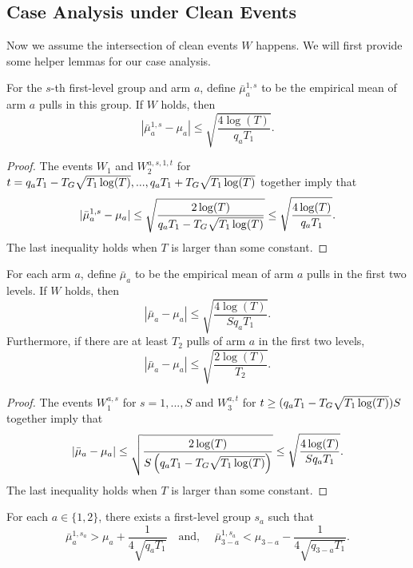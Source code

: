 \subsection{Case Analysis under Clean Events}
Now we assume the intersection of clean events $W$ happens. We will
first provide some helper lemmas for our case analysis.

\begin{lemma}
  For the $s$-th first-level group and arm $a$, define
  $\bar{\mu}_a^{1,s}$ to be the empirical mean of arm $a$ pulls in
  this group. If $W$ holds, then
  \[
    |\bar{\mu}_a^{1,s} - \mu_a| \leq \sqrt{\frac{4\log(T)}{q_a T_1}}.
  \]
\end{lemma}

\begin{proof}
  The events $W_1$ and $W_2^{a,s,1,t}$ for
  $t = q_a T_1- T_G \sqrt{T_1\log(T)},...,q_a T_1 + T_G
  \sqrt{T_1\log(T)}$ together imply that
\[
|\bar{\mu}_a^{1,s} - \mu_a| \leq \sqrt{\frac{2\log(T)}{q_a T_1- T_G \sqrt{T_1\log(T)}}} \leq \sqrt{\frac{4\log(T)}{q_a T_1}}.
\]
The last inequality holds when $T$ is larger than some constant.
\end{proof}


\begin{lemma}
  For each arm $a$, define $\bar{\mu}_a$ to be the empirical mean of
  arm $a$ pulls in the first two levels. If $W$ holds, then
  \[
    |\bar{\mu}_a - \mu_a| \leq \sqrt{\frac{4\log(T)}{S q_a T_1}} .
  \]
Furthermore, if there are at least $T_2$ pulls of arm $a$ in the first
two levels,
\[
|\bar{\mu}_a-\mu_a| \leq \sqrt{\frac{2\log(T)}{T_2}}. 
\]
\end{lemma}

\begin{proof}
The events $W_1^{a,s}$ for $s=1,...,S$ and $W_3^{a,t}$ for $t \geq  (q_a T_1- T_G \sqrt{T_1\log(T)})S$ together imply that
  \[
    |\bar{\mu}_a - \mu_a| \leq \sqrt{\frac{2\log(T)}{S\left(q_a T_1- T_G \sqrt{T_1\log(T)}\right)}} \leq \sqrt{\frac{4\log(T)}{S q_a T_1}} .
\]
The last inequality holds when $T$ is larger than some constant.
\end{proof}



\begin{lemma}
  For each $a \in \{1,2\}$, there exists a first-level group $s_a$
  such that
\[\bar{\mu}_a ^{1,s_a} > \mu_a + \frac{1}{4\sqrt{q_aT_1}} \quad \mbox{and, } \quad
\bar{\mu}_{3-a} ^{1,s_a} < \mu_{3-a}   - \frac{1}{4\sqrt{q_{3-a} T_1}}.
\]
\end{lemma}

